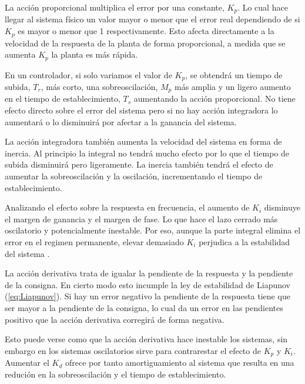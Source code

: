 \documentclass{book}
\begin{document}
La acci\'on proporcional multiplica el error por una constante, $K_p$. Lo cual hace llegar al sistema f\'isico un valor mayor o menor que el error real dependiendo de si $K_p$ es mayor o menor que 1 respectivamente. Esto afecta directamente a la velocidad de la respuesta de la planta de forma proporcional, a medida que se aumenta $K_p$ la planta es m\'as r\'apida. \par

En un controlador, si solo variamos el valor de $K_p$, se obtendr\'a un tiempo de subida, $T_r$, m\'as corto, una sobreoscilaci\'on, $M_p$ m\'as amplia y un ligero aumento en el tiempo de establecimiento, $T_s$ aumentando la acci\'on proporcional. No tiene efecto directo sobre el error del sistema pero si no hay acci\'on integradora lo aumentar\'a o lo disminuir\'a por afectar a la ganancia del sistema. \par

La acci\'on integradora tambi\'en aumenta la velocidad del sistema en forma de inercia. Al principio la integral no tendr\'a mucho efecto por lo que el tiempo de subida disminuir\'a pero ligeramente. La inercia tambi\'en tendr\'a el efecto de aumentar la sobreoscilaci\'on y la oscilaci\'on, incrementando el tiempo de establecimiento. \par

Analizando el efecto sobre la respuesta en frecuencia, el aumento de $K_i$ disminuye el margen de ganancia y el margen de fase. Lo que hace el lazo cerrado m\'as oscilatorio y potencialmente inestable. Por eso, aunque la parte integral elimina el error en el regimen permanente, elevar demasiado $K_i$ perjudica a la estabilidad del sistema \cite{PIDtunning}.  \par

La acci\'on derivativa trata de igualar la pendiente de la respuesta y la pendiente de la consigna. En cierto modo esto incumple la ley de estabilidad de Liapunov (\ref{eq:Liapunov}). Si hay un error negativo la pendiente de la respuesta tiene que ser mayor a la pendiente de la consigna, lo cual da un error en las pendientes positivo que la acci\'on derivativa corregir\'a de forma negativa. \par 

Esto puede verse como que la acci\'on derivativa hace inestable los sistemas, sin embargo en los sistemas oscilatorios sirve para contrarestar el efecto de $K_p$ y $K_i$. Aumentar el $K_d$ ofrece por tanto amortiguamiento al sistema que resulta en una reduci\'on en la sobreoscilaci\'on y el tiempo de establecimiento.\par
\end{document}
